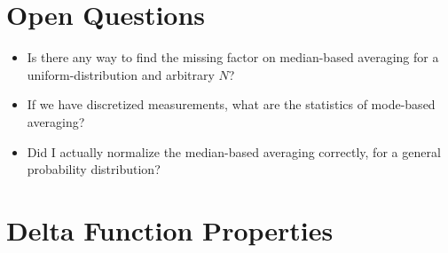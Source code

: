 \documentclass[12pt]{report}
\begin{document}
\section{Open Questions}

\begin{itemize}
    \item Is there any way to find the missing factor on median-based averaging
        for a uniform-distribution and arbitrary $N$?
    \item If we have discretized measurements, what are the statistics of
        mode-based averaging?
    \item Did I actually normalize the median-based averaging correctly, for a
        general probability distribution?
\end{itemize}

\section{Delta Function Properties}
\end{document}
